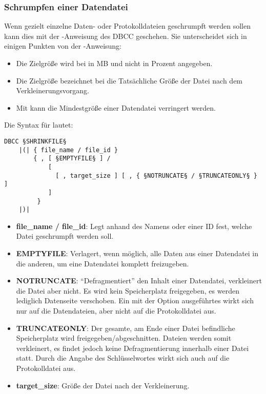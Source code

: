         \subsubsection{Schrumpfen einer Datendatei}
          Wenn gezielt einzelne Daten- oder Protokolldateien geschrumpft werden
          sollen kann dies mit der -Anweisung des DBCC
          geschehen. Sie unterscheidet sich in einigen Punkten von der
          -Anweisung:
          \begin{itemize}
              \item Die Zielgröße wird bei  in MB und
              nicht in Prozent angegeben.
              \item Die Zielgröße bezeichnet bei  die
              Tatsächliche Größe der Datei nach dem Verkleinerungsvorgang.
              \item Mit  kann die Mindestgröße einer
              Datendatei verringert werden.
          \end{itemize}
          Die Syntax f\"ur  lautet:
          \begin{lstlisting}[language=ebnf, caption={Die Syntax zu
          SHRINKFILE}, label=admin03_36]
DBCC §SHRINKFILE§
    |(| { file_name / file_id }
        { , [ §EMPTYFILE§ ] / 
            [ 
              [ , target_size ] [ , { §NOTRUNCATE§ / §TRUNCATEONLY§ } ]
            ]
         }
    |)|
          \end{lstlisting}
          \begin{itemize}
            \item \textbf{file\_name / file\_id}: Legt anhand des
            Namens oder einer ID fest, welche Datei geschrumpft werden soll.
            \item \textbf{EMPTYFILE}: Verlagert, wenn möglich, alle Daten aus
            einer Datendatei in die anderen, um eine Datendatei komplett
            freizugeben.
            \item \textbf{NOTRUNCATE}: \enquote{Defragmentiert} den
            Inhalt einer Datendatei, verkleinert die Datei aber nicht. Es wird
            kein Speicherplatz freigegeben, es werden lediglich Datenseite
            verschoben. Ein mit der Option 
            ausgeführtes  wirkt sich nur
            auf die Datendateien, aber nicht auf die Protokolldatei aus.
            \item \textbf{TRUNCATEONLY}: Der gesamte, am Ende einer
            Datei befindliche Speicherplatz wird freigegeben/abgeschnitten.
            Dateien werden somit verkleinert, es findet jedoch keine
            Defragmentierung innerhalb einer Datei statt. Durch die Angabe
            des Schlüsselwortes  wirkt sich
             auch auf die Protokolldatei aus.
            \item \textbf{target\_size}: Größe der Datei nach der
            Verkleinerung.
          \end{itemize}
